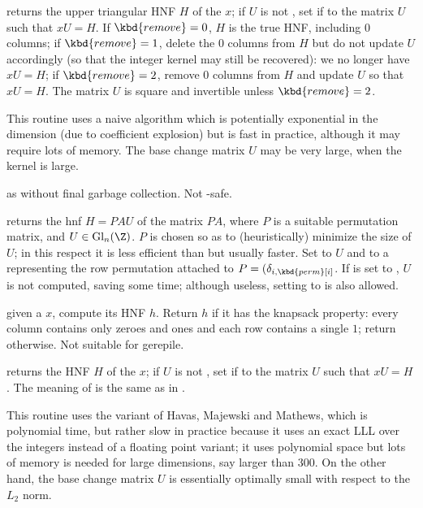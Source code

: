  returns the upper triangular
HNF $H$ of the  $x$; if $U$ is not , set if to the matrix
$U$ such that $x U = H$. If $\kbd{remove} = 0$, $H$ is the true HNF,
including $0$ columns; if $\kbd{remove} = 1$, delete the $0$ columns from $H$
but do not update $U$ accordingly (so that the integer kernel may still be
recovered): we no longer have $x U = H$; if $\kbd{remove} = 2$, remove $0$
columns from $H$ and update $U$ so that $x U = H$. The matrix $U$ is square
and invertible unless $\kbd{remove} = 2$.

This routine uses a naive algorithm which is potentially exponential in the
dimension (due to coefficient explosion) but is fast in practice, although it
may require lots of memory. The base change matrix $U$ may be very large,
when the kernel is large.

 as  without
final garbage collection. Not -safe.

 returns the hnf
$H = P A U$ of the matrix $P A$, where $P$ is a suitable permutation matrix,
and $U\in \text{Gl}_n(\Z)$. $P$ is chosen so as to (heuristically) minimize the
size of $U$; in this respect it is less efficient than 
but usually faster. Set  to $U$ and  to a 
representing the row permutation attached to $P = (\delta_{i,\kbd{perm}[i]}$.
If  is set to , $U$ is not computed, saving some time;
although useless, setting  to  is also allowed.

 given a  $x$, compute its
HNF $h$. Return $h$ if it has the knapsack property: every column contains
only zeroes and ones and each row contains a single $1$;
return  otherwise. Not suitable for gerepile.

 returns the HNF $H$ of the
 $x$; if $U$ is not , set if to the matrix $U$ such that $x
U = H$. The meaning of  is the same as in .

This routine uses the  variant of Havas, Majewski and Mathews, which is
polynomial time, but rather slow in practice because it uses an exact LLL
over the integers instead of a floating point variant; it uses polynomial
space but lots of memory is needed for large dimensions, say larger than 300.
On the other hand, the base change matrix $U$ is essentially optimally small
with respect to the $L_2$ norm.

